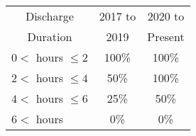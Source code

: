 \begin{tabular}{|c|c|c|}\hline
Discharge & 2017 to & 2020 to  \\
Duration & 2019 & Present  \\ \hline
$0 <$ hours $\leq 2$   &   100\%   &   100\%    \\
$2 <$ hours $\leq 4$    &   50\%   &    100\%   \\
$4 <$ hours $\leq 6$      &   25\%   &   50\%   \\
\multicolumn{1}{|l|}{$6 <$ hours}  &    0\%  &    0\%    \\\hline
\end{tabular}